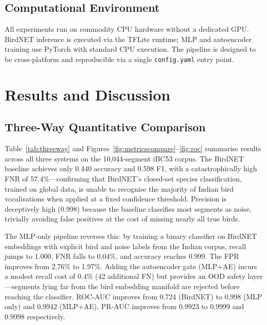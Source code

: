 \documentclass[conference]{IEEEtran}
\begin{document}
\subsection{Computational Environment}
All experiments run on commodity CPU hardware without a dedicated GPU. BirdNET inference is executed via the TFLite runtime; MLP and autoencoder training use PyTorch with standard CPU execution. The pipeline is designed to be cross-platform and reproducible via a single \texttt{config.yaml} entry point.

\section{Results and Discussion}

\subsection{Three-Way Quantitative Comparison}

Table~\ref{tab:threeway} and Figures~\ref{fig:metricscompare}--\ref{fig:roc} summarise results across all three systems on the 10,044-segment iBC53 corpus. The BirdNET baseline achieves only 0.440 accuracy and 0.598 F1, with a catastrophically high FNR of 57.4\%---confirming that BirdNET's closed-set species classification, trained on global data, is unable to recognise the majority of Indian bird vocalisations when applied at a fixed confidence threshold. Precision is deceptively high (0.998) because the baseline classifies most segments as noise, trivially avoiding false positives at the cost of missing nearly all true birds.

The MLP-only pipeline reverses this: by training a binary classifier on BirdNET embeddings with explicit bird and noise labels from the Indian corpus, recall jumps to 1.000, FNR falls to 0.04\%, and accuracy reaches 0.999. The FPR improves from 2.76\% to 1.97\%. Adding the autoencoder gate (MLP+AE) incurs a modest recall cost of 0.4\% (42 additional FN) but provides an OOD safety layer---segments lying far from the bird embedding manifold are rejected before reaching the classifier. ROC-AUC improves from 0.724 (BirdNET) to 0.998 (MLP only) and 0.9942 (MLP+AE). PR-AUC improves from 0.9923 to 0.9999 and 0.9998 respectively.
\end{document}
